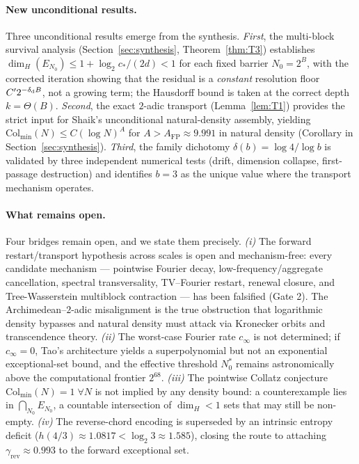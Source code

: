 \documentclass[12pt,a4paper]{article}
\theoremstyle{remark}
\begin{document}
\paragraph{New unconditional results.}
Three unconditional results emerge from the synthesis.
\emph{First}, the multi-block survival analysis
(Section~\ref{sec:synthesis}, Theorem~\ref{thm:T3}) establishes
$\dim_H(E_{N_0})\le1+\log_2 c_*/(2d)<1$ for each fixed barrier $N_0=2^B$,
with the corrected iteration showing that the residual is a
\emph{constant} resolution floor $C'2^{-\delta_{\rm d}B}$, not a growing term; the
Hausdorff bound is taken at the correct depth $k=\Theta(B)$.
\emph{Second}, the exact $2$-adic transport (Lemma~\ref{lem:T1}) provides the
strict input for Shaik's unconditional natural-density assembly, yielding
$\mathrm{Col}_{\min}(N)\le C(\log N)^A$ for $A>A_{\mathrm{FP}}\approx9.991$
in natural density (Corollary in Section~\ref{sec:synthesis}).
\emph{Third}, the family dichotomy $\delta(b)=\log4/\log b$ is validated by
three independent numerical tests (drift, dimension collapse, first-passage
destruction) and identifies $b=3$ as the unique value where the transport
mechanism operates.
\paragraph{What remains open.}
Four bridges remain open, and we state them precisely.
\emph{(i)} The forward restart/transport hypothesis across scales is open and
mechanism-free: every candidate mechanism --- pointwise Fourier decay,
low-frequency/aggregate cancellation, spectral transversality, TV--Fourier
restart, renewal closure, and Tree-Wasserstein multiblock contraction --- has
been falsified (Gate 2). The Archimedean--$2$-adic misalignment is the true
obstruction that logarithmic density bypasses and natural density must attack
via Kronecker orbits and transcendence theory.
\emph{(ii)} The worst-case Fourier rate $c_\infty$ is not determined; if
$c_\infty=0$, Tao's architecture yields a superpolynomial but not an
exponential exceptional-set bound, and the effective threshold $N_0^*$
remains astronomically above the computational frontier $2^{68}$.
\emph{(iii)} The pointwise Collatz conjecture
$\mathrm{Col}_{\min}(N)=1\;\forall N$ is not implied by any density bound:
a counterexample lies in $\bigcap_{N_0}E_{N_0}$, a countable intersection of
$\dim_H<1$ sets that may still be non-empty.
\emph{(iv)} The reverse-chord encoding is superseded by an intrinsic entropy
deficit ($h(4/3)\approx1.0817<\log_2 3\approx1.585$), closing the route to
attaching $\gamma_{\mathrm{rev}}\approx0.993$ to the forward exceptional set.
\end{document}
